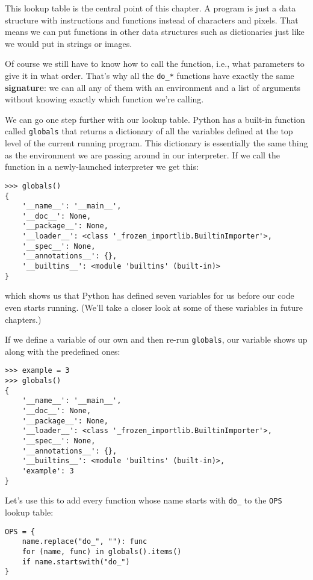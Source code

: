 \documentclass{scrbook}
\newcommand{\glossref}[1]{\textbf{#1}}
\begin{document}
This lookup table is the central point of this chapter.
A program is just a data structure
with instructions and functions instead of characters and pixels.
That means we can put functions in other data structures such as dictionaries
just like we would put in strings or images.


Of course we still have to know how to call the function,
i.e.,
what parameters to give it in what order.
That's why all the \texttt{do\_*} functions have exactly the same \glossref{signature}:
we can all any of them with an environment and a list of arguments
without knowing exactly which function we're calling.


We can go one step further with our lookup table.
Python has a built-in function called \texttt{globals}
that returns a dictionary of all the variables defined at the top level of the current running program.
This dictionary is essentially the same thing as the environment
we are passing around in our interpreter.
If we call the function in a newly-launched interpreter we get this:

\begin{lstlisting}[frame=single,frameround=tttt]
>>> globals()
{
    '__name__': '__main__',
    '__doc__': None,
    '__package__': None,
    '__loader__': <class '_frozen_importlib.BuiltinImporter'>,
    '__spec__': None,
    '__annotations__': {},
    '__builtins__': <module 'builtins' (built-in)>
}
\end{lstlisting}


\noindent which shows us that Python has defined seven variables for us
before our code even starts running.
(We'll take a closer look at some of these variables in future chapters.)


If we define a variable of our own and then re-run \texttt{globals},
our variable shows up along with the predefined ones:

\begin{lstlisting}[frame=single,frameround=tttt]
>>> example = 3
>>> globals()
{
    '__name__': '__main__',
    '__doc__': None,
    '__package__': None,
    '__loader__': <class '_frozen_importlib.BuiltinImporter'>,
    '__spec__': None,
    '__annotations__': {},
    '__builtins__': <module 'builtins' (built-in)>,
    'example': 3
}
\end{lstlisting}


Let's use this to add every function whose name starts with \texttt{do\_}
to the \texttt{OPS} lookup table:


\begin{lstlisting}[frame=single,frameround=tttt]
OPS = {
    name.replace("do_", ""): func
    for (name, func) in globals().items()
    if name.startswith("do_")
}
\end{lstlisting}
\end{document}
